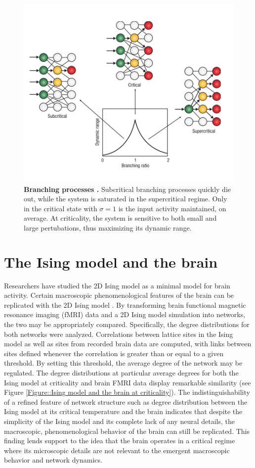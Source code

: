 \documentclass[12pt]{article}
\begin{document}
\begin{figure}      
  \begin{center}    
 \includegraphics[width=.7\textwidth]{Branchingprocesschialvo}    
    \caption{\textbf{Branching processes \cite{Chialvo2006a}.} Subcritical branching processes quickly die out, while the system is saturated in the supercritical regime. Only in the critical state with $\sigma = 1$ is the input activity maintained, on average. At criticality, the system is sensitive to both small and large pertubations, thus maximizing its dynamic range.}
   \label{Figure::Critical Branching Process}   
  \end{center}     
   \end{figure}

\section*{The Ising model and the brain}
Researchers have studied the 2D Ising model as a minimal model for brain activity. Certain macroscopic phenomenological features of the brain can be replicated with the 2D Ising model \cite{Fraiman2009a}. By transforming brain functional magnetic resonance imaging (fMRI) data and a 2D Ising model simulation into networks, the two may be appropriately compared. Specifically, the degree distributions for both networks were analyzed. Correlations between lattice sites in the Ising model as well as sites from recorded brain data are computed, with links between sites defined whenever the correlation is greater than or equal to a given threshold. By setting this threshold, the average degree of the network may be regulated. The degree distributions at particular average degrees for both the Ising model at criticality and brain FMRI data display remarkable similarity (see Figure \ref{Figure::Ising model and the brain at criticality}). The indistinguishability of a refined feature of network structure such as degree distribution between the Ising model at its critical temperature and the brain indicates that despite the simplicity of the Ising model and its complete lack of any neural details, the macroscopic, phenomenological behavior of the brain can still be replicated. This finding lends support to the idea that the brain operates in a critical regime where its microscopic details are not relevant to the emergent macroscopic behavior and network dynamics.
\end{document}
